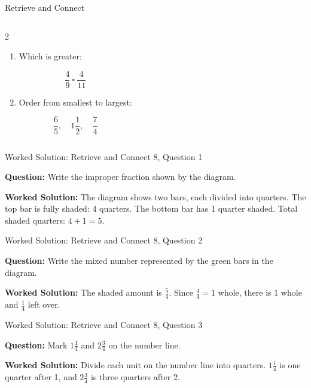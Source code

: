 \documentclass{beamer}
\newcommand{\ashow}[1]{\uncover<2->{\textcolor{red}{\small #1}}}
\begin{document}
\begin{frame}{Retrieve and Connect}
\begin{columns}
\begin{multicols}{2}
\begin{enumerate}
\[
\frac{16}{40}
\]
\ashow{$\frac{2}{5}$}

\item Which is greater:

\[
\frac{4}{9}\ \square\ \frac{4}{11}
\]
\ashow{$\frac{4}{9}$}

\item Order from smallest to largest:

\[
\frac{6}{5},\quad 1\frac{1}{2},\quad \frac{7}{4}
\]
\ashow{$\frac{6}{5},\ 1\frac{1}{2},\ \frac{7}{4}$}

\end{enumerate}

\end{multicols}

\end{columns}

\end{frame}

\begin{frame}{Worked Solution: Retrieve and Connect 8, Question 1}
\hypertarget{work-st8}{}

\textbf{Question:} Write the improper fraction shown by the diagram.

\textbf{Worked Solution:} The diagram shows two bars, each divided into quarters. The top bar is fully shaded: 4 quarters. The bottom bar has 1 quarter shaded. Total shaded quarters: $4+1=5$. \ashow{$\frac{5}{4}$.}
\end{frame}

\begin{frame}{Worked Solution: Retrieve and Connect 8, Question 2}

\textbf{Question:} Write the mixed number represented by the green bars in the diagram.

\textbf{Worked Solution:} The shaded amount is $\frac54$. Since $\frac44 = 1$ whole, there is 1 whole and $\frac14$ left over. \ashow{$1\frac14$.}
\end{frame}

\begin{frame}{Worked Solution: Retrieve and Connect 8, Question 3}

\textbf{Question:} Mark $1\frac{1}{4}$ and $2\frac{3}{4}$ on the number line.

\textbf{Worked Solution:} Divide each unit on the number line into quarters. $1\frac14$ is one quarter after 1, and $2\frac34$ is three quarters after 2. \ashow{Mark at $1\frac14$ and $2\frac34$.}
\end{frame}
\end{document}
